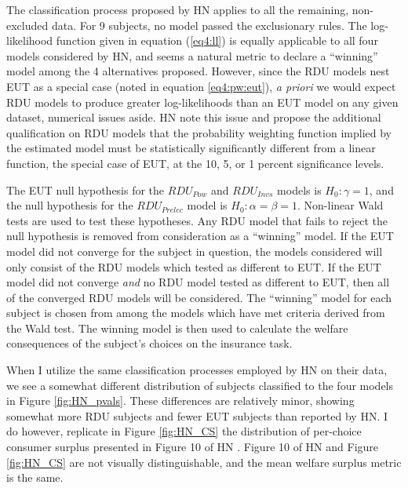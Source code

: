 \documentclass[../main.tex]{subfiles}
\begin{document}
The classification process proposed by HN applies to all the remaining, non-excluded data.
For 9 subjects, no model passed the exclusionary rules.
The log-likelihood function given in equation (\ref{eq4:ll}) is equally applicable to all four models considered by HN, and seems a natural metric to declare a \enquote{winning} model among the 4 alternatives proposed.
However, since the RDU models nest EUT as a special case (noted in equation \ref{eq4:pw:eut}), \textit{a priori} we would expect RDU models to produce greater log-likelihoods than an EUT model on any given dataset, numerical issues aside.
HN \parencite*[102]{Harrison2016} note this issue and propose the additional qualification on RDU models that the probability weighting function implied by the estimated model must be statistically significantly different from a linear function, the special case of EUT, at the 10, 5, or 1 percent significance levels.

The EUT null hypothesis for the $\mathit{RDU_{Pow}}$ and $\mathit{RDU_{Invs}}$ models is $H_0: \gamma = 1$, and the null hypothesis for the $\mathit{RDU_{Prelec}}$ model is $H_0: \alpha = \beta = 1$.
Non-linear Wald tests are used to test these hypotheses.
Any RDU model that fails to reject the null hypothesis is removed from consideration as a \enquote{winning} model.
If the EUT model did not converge for the subject in question, the models considered will only consist of the RDU models which tested as different to EUT.
If the EUT model did not converge \textit{and} no RDU model tested as different to EUT, then all of the converged RDU models will be considered.
The \enquote{winning} model for each subject is chosen from among the models which have met criteria derived from the Wald test.
The winning model is then used to calculate the welfare consequences of the subject's choices on the insurance task.

When I utilize the same classification processes employed by HN on their data, we see a somewhat different distribution of subjects classified to the four models in Figure \ref{fig:HN_pvals}.
These differences are relatively minor, showing somewhat more RDU subjects and fewer EUT subjects than reported by HN.
I do however, replicate in Figure \ref{fig:HN_CS} the distribution of per-choice consumer surplus presented in Figure 10 of HN \parencite[108]{Harrison2016}.
Figure 10 of HN and Figure \ref{fig:HN_CS} are not visually distinguishable, and the mean welfare surplus metric is the same.
\end{document}
